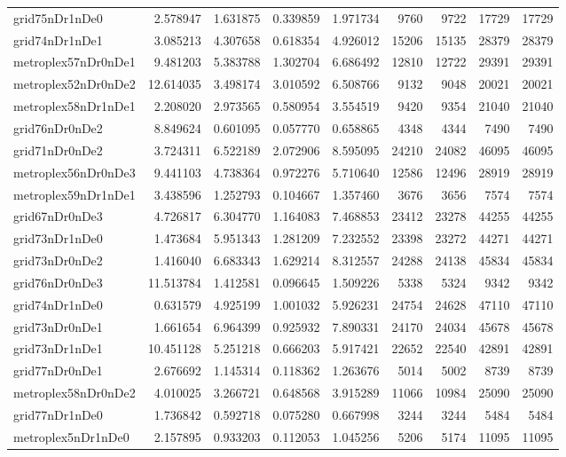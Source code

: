 \begin{longtable}{|l|r|r|r|r|r|r|r|r|}
grid75nDr1nDe0 & 2.578947 & 1.631875 & 0.339859 & 1.971734 & 9760 & 9722 & 17729 & 17729 \\
grid74nDr1nDe1 & 3.085213 & 4.307658 & 0.618354 & 4.926012 & 15206 & 15135 & 28379 & 28379 \\
metroplex57nDr0nDe1 & 9.481203 & 5.383788 & 1.302704 & 6.686492 & 12810 & 12722 & 29391 & 29391 \\
metroplex52nDr0nDe2 & 12.614035 & 3.498174 & 3.010592 & 6.508766 & 9132 & 9048 & 20021 & 20021 \\
metroplex58nDr1nDe1 & 2.208020 & 2.973565 & 0.580954 & 3.554519 & 9420 & 9354 & 21040 & 21040 \\
grid76nDr0nDe2 & 8.849624 & 0.601095 & 0.057770 & 0.658865 & 4348 & 4344 & 7490 & 7490 \\
grid71nDr0nDe2 & 3.724311 & 6.522189 & 2.072906 & 8.595095 & 24210 & 24082 & 46095 & 46095 \\
metroplex56nDr0nDe3 & 9.441103 & 4.738364 & 0.972276 & 5.710640 & 12586 & 12496 & 28919 & 28919 \\
metroplex59nDr1nDe1 & 3.438596 & 1.252793 & 0.104667 & 1.357460 & 3676 & 3656 & 7574 & 7574 \\
grid67nDr0nDe3 & 4.726817 & 6.304770 & 1.164083 & 7.468853 & 23412 & 23278 & 44255 & 44255 \\
grid73nDr1nDe0 & 1.473684 & 5.951343 & 1.281209 & 7.232552 & 23398 & 23272 & 44271 & 44271 \\
grid73nDr0nDe2 & 1.416040 & 6.683343 & 1.629214 & 8.312557 & 24288 & 24138 & 45834 & 45834 \\
grid76nDr0nDe3 & 11.513784 & 1.412581 & 0.096645 & 1.509226 & 5338 & 5324 & 9342 & 9342 \\
grid74nDr1nDe0 & 0.631579 & 4.925199 & 1.001032 & 5.926231 & 24754 & 24628 & 47110 & 47110 \\
grid73nDr0nDe1 & 1.661654 & 6.964399 & 0.925932 & 7.890331 & 24170 & 24034 & 45678 & 45678 \\
grid73nDr1nDe1 & 10.451128 & 5.251218 & 0.666203 & 5.917421 & 22652 & 22540 & 42891 & 42891 \\
grid77nDr0nDe1 & 2.676692 & 1.145314 & 0.118362 & 1.263676 & 5014 & 5002 & 8739 & 8739 \\
metroplex58nDr0nDe2 & 4.010025 & 3.266721 & 0.648568 & 3.915289 & 11066 & 10984 & 25090 & 25090 \\
grid77nDr1nDe0 & 1.736842 & 0.592718 & 0.075280 & 0.667998 & 3244 & 3244 & 5484 & 5484 \\
metroplex5nDr1nDe0 & 2.157895 & 0.933203 & 0.112053 & 1.045256 & 5206 & 5174 & 11095 & 11095 \\

\end{longtable}
